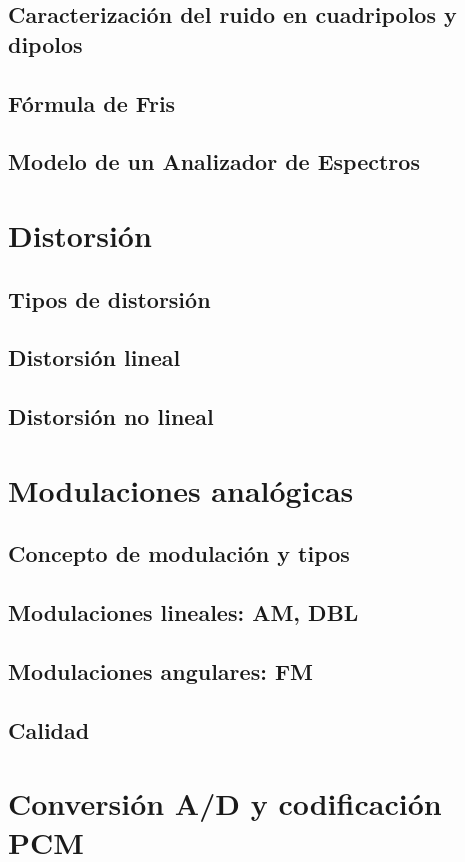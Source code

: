 \documentclass[a4paper]{book}
\begin{document}
\section{Caracterización del ruido en cuadripolos y dipolos}
\section{Fórmula de Fris}
\section{Modelo de un Analizador de Espectros}

\chapter{Distorsión}
\section{Tipos de distorsión}
\section{Distorsión lineal}
\section{Distorsión no lineal}

\chapter{Modulaciones analógicas}
\section{Concepto de modulación y tipos}
\section{Modulaciones lineales: AM, DBL}
\section{Modulaciones angulares: FM}
\section{Calidad}

\chapter{Conversión A/D y codificación PCM}
\end{document}
